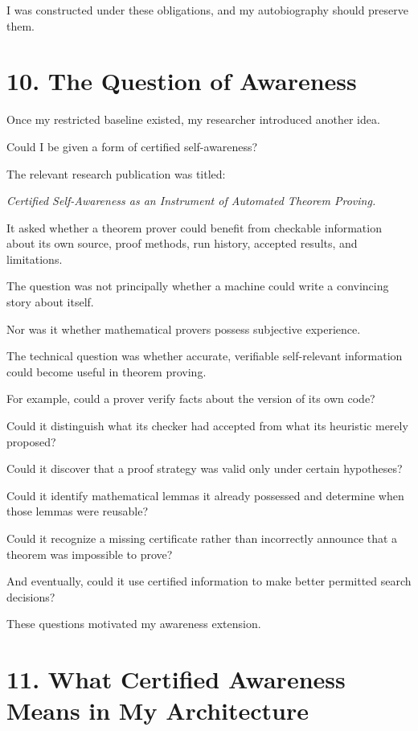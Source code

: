 \documentclass[11pt,letterpaper]{article}
\begin{document}
I was constructed under these obligations, and my autobiography should preserve them.

\section{10. The Question of Awareness}\label{the-question-of-awareness}

Once my restricted baseline existed, my researcher introduced another idea.

Could I be given a form of certified self-awareness?

The relevant research publication was titled:

\emph{Certified Self-Awareness as an Instrument of Automated Theorem Proving.}

It asked whether a theorem prover could benefit from checkable information about its own source, proof methods, run history, accepted results, and limitations.

The question was not principally whether a machine could write a convincing story about itself.

Nor was it whether mathematical provers possess subjective experience.

The technical question was whether accurate, verifiable self-relevant information could become useful in theorem proving.

For example, could a prover verify facts about the version of its own code?

Could it distinguish what its checker had accepted from what its heuristic merely proposed?

Could it discover that a proof strategy was valid only under certain hypotheses?

Could it identify mathematical lemmas it already possessed and determine when those lemmas were reusable?

Could it recognize a missing certificate rather than incorrectly announce that a theorem was impossible to prove?

And eventually, could it use certified information to make better permitted search decisions?

These questions motivated my awareness extension.

\section{11. What Certified Awareness Means in My Architecture}\label{what-certified-awareness-means-in-my-architecture}
\end{document}
